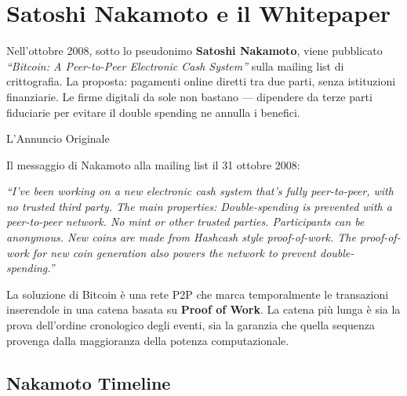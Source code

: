 \documentclass[
  italian,
  openany]{book}
\begin{document}
\section{Satoshi Nakamoto e il
Whitepaper}\label{satoshi-nakamoto-e-il-whitepaper}

Nell'ottobre 2008, sotto lo pseudonimo \textbf{Satoshi Nakamoto}, viene
pubblicato \emph{``Bitcoin: A Peer-to-Peer Electronic Cash System''}
sulla mailing list di crittografia. La proposta: pagamenti online
diretti tra due parti, senza istituzioni finanziarie. Le firme digitali
da sole non bastano --- dipendere da terze parti fiduciarie per evitare
il double spending ne annulla i benefici.

\begin{callouttip}{L’Annuncio Originale}

Il messaggio di Nakamoto alla mailing list il 31 ottobre 2008:

\emph{``I've been working on a new electronic cash system that's fully
peer-to-peer, with no trusted third party. The main properties:
Double-spending is prevented with a peer-to-peer network. No mint or
other trusted parties. Participants can be anonymous. New coins are made
from Hashcash style proof-of-work. The proof-of-work for new coin
generation also powers the network to prevent double-spending.''}

\end{callouttip}

La soluzione di Bitcoin è una rete P2P che marca temporalmente le
transazioni inserendole in una catena basata su \textbf{Proof of Work}.
La catena più lunga è sia la prova dell'ordine cronologico degli eventi,
sia la garanzia che quella sequenza provenga dalla maggioranza della
potenza computazionale.

\subsection{Nakamoto Timeline}\label{nakamoto-timeline}
\end{document}
